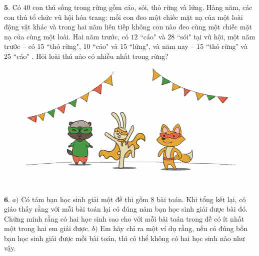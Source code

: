 \begin{multicols}{2}
\begin{figure}[H]
		\vspace*{-15pt}
	\end{figure}
	$\pmb{5.}$ Có $40$ con thú sống trong rừng gồm cáo, sói, thỏ rừng và lửng. Hàng năm, các con thú tổ chức vũ hội hóa trang: mỗi con đeo một chiếc mặt nạ của một loài động vật khác và trong hai năm liên tiếp không con nào đeo cùng một chiếc mặt nạ của cùng một loài. Hai năm trước, có $12$ ``cáo" và $28$ ``sói" tại vũ hội, một năm trước -- có $15$ ``thỏ rừng", $10$ ``cáo" và $15$ ``lửng", và năm nay -- $15$ ``thỏ rừng" và $25$ ``cáo" . Hỏi loài thú nào có nhiều nhất trong rừng? 
	\begin{figure}[H]
		\centering
		\vspace*{-5pt}
		\captionsetup{labelformat= empty, justification=centering}
		\includegraphics[width=1\linewidth]{Pi4_bai5}
		\vspace*{-15pt}
	\end{figure}
	$\pmb{6.}$ $a)$	Có tám bạn học sinh giải một đề thi gồm $8$ bài toán. Khi tổng kết lại, cô giáo thấy rằng với mỗi bài toán lại có đúng  năm bạn học sinh giải được bài đó. Chứng minh rằng có hai học sinh sao cho với mỗi bài toán trong đề có ít nhất một trong hai em giải được.
	\vskip 0.1cm
	$b)$	Em hãy chỉ ra một ví dụ rằng, nếu có đúng bốn bạn học sinh giải được mỗi bài toán, thì có thể không có hai  học sinh nào như vậy.
	\begin{figure}[H]
		\centering
		\vspace*{-5pt}
		\captionsetup{labelformat= empty, justification=centering}

\end{figure}
\end{multicols}
